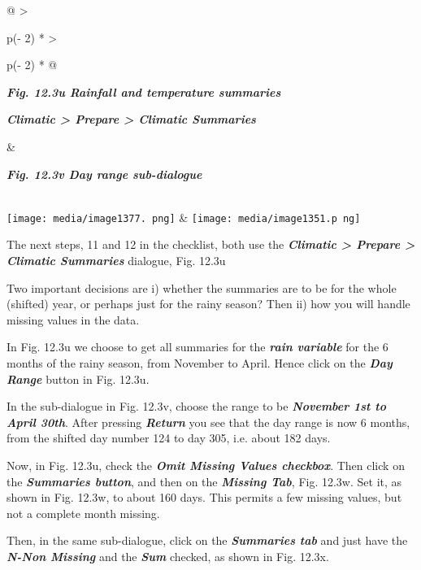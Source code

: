 \documentclass[
  letterpaper,
  DIV=11,
  numbers=noendperiod]{scrreprt}
\begin{document}
\begin{longtable}[]{@{}
  >{\raggedright\arraybackslash}p{(\columnwidth - 2\tabcolsep) * }
  >{\raggedright\arraybackslash}p{(\columnwidth - 2\tabcolsep) * }@{}}
\toprule\noalign{}
\begin{minipage}[b]{\linewidth}\raggedright
\textbf{\emph{Fig. 12.3u Rainfall and temperature summaries}}

\textbf{\emph{Climatic \textgreater{} Prepare \textgreater{} Climatic
Summaries}}
\end{minipage} & \begin{minipage}[b]{\linewidth}\raggedright
\textbf{\emph{Fig. 12.3v Day range sub-dialogue}}
\end{minipage} \\
\midrule\noalign{}
\endhead
\bottomrule\noalign{}
\endlastfoot
\texttt{[image: media/image1377. png]}
&
\texttt{[image: media/image1351.p ng]} \\
\end{longtable}

The next steps, 11 and 12 in the checklist, both use the
\textbf{\emph{Climatic \textgreater{} Prepare \textgreater{} Climatic
Summaries}} dialogue, Fig. 12.3u

Two important decisions are i) whether the summaries are to be for the
whole (shifted) year, or perhaps just for the rainy season? Then ii) how
you will handle missing values in the data.

In Fig. 12.3u we choose to get all summaries for the \textbf{\emph{rain
variable}} for the 6 months of the rainy season, from November to April.
Hence click on the \textbf{\emph{Day Range}} button in Fig. 12.3u.

In the sub-dialogue in Fig. 12.3v, choose the range to be
\textbf{\emph{November 1st to April 30th}}. After pressing
\textbf{\emph{Return}} you see that the day range is now 6 months, from
the shifted day number 124 to day 305, i.e. about 182 days.

Now, in Fig. 12.3u, check the \textbf{\emph{Omit Missing Values
checkbox}}. Then click on the \textbf{\emph{Summaries button}}, and then
on the \textbf{\emph{Missing Tab}}, Fig. 12.3w. Set it, as shown in Fig.
12.3w, to about 160 days. This permits a few missing values, but not a
complete month missing.

Then, in the same sub-dialogue, click on the \textbf{\emph{Summaries
tab}} and just have the \textbf{\emph{N-Non Missing}} and the
\textbf{\emph{Sum}} checked, as shown in Fig. 12.3x.
\end{document}
